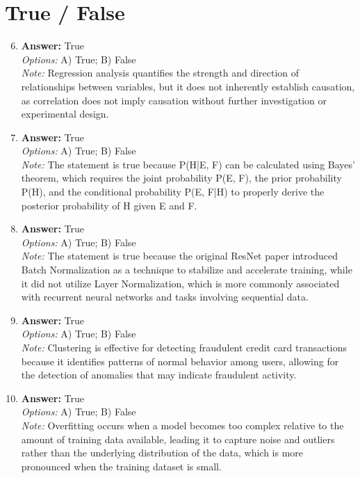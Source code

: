\documentclass[12pt]{article}
\begin{document}
\section*{True / False}
\begin{enumerate}[label=\arabic*.]
\setcounter{enumi}{5}
\item \textbf{Answer:} True
\\ \textit{Options:} A) True; B) False
\\ \textit{Note:} Regression analysis quantifies the strength and direction of relationships between variables, but it does not inherently establish causation, as correlation does not imply causation without further investigation or experimental design.
\item \textbf{Answer:} True
\\ \textit{Options:} A) True; B) False
\\ \textit{Note:} The statement is true because P(H|E, F) can be calculated using Bayes' theorem, which requires the joint probability P(E, F), the prior probability P(H), and the conditional probability P(E, F|H) to properly derive the posterior probability of H given E and F.
\item \textbf{Answer:} True
\\ \textit{Options:} A) True; B) False
\\ \textit{Note:} The statement is true because the original ResNet paper introduced Batch Normalization as a technique to stabilize and accelerate training, while it did not utilize Layer Normalization, which is more commonly associated with recurrent neural networks and tasks involving sequential data.
\item \textbf{Answer:} True
\\ \textit{Options:} A) True; B) False
\\ \textit{Note:} Clustering is effective for detecting fraudulent credit card transactions because it identifies patterns of normal behavior among users, allowing for the detection of anomalies that may indicate fraudulent activity.
\item \textbf{Answer:} True
\\ \textit{Options:} A) True; B) False
\\ \textit{Note:} Overfitting occurs when a model becomes too complex relative to the amount of training data available, leading it to capture noise and outliers rather than the underlying distribution of the data, which is more pronounced when the training dataset is small.
\end{enumerate}
\end{document}
